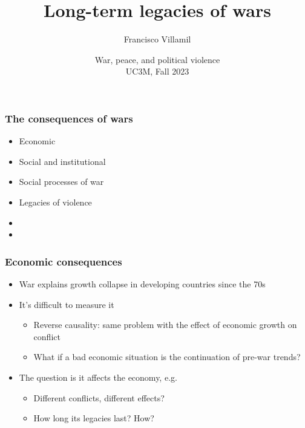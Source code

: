 \documentclass[aspectratio=43]{beamer}
\title{\huge Long-term legacies of wars}
\author{Francisco Villamil}
\date{War, peace, and political violence\\UC3M, Fall 2023}
\begin{document}
\begin{frame}
  \titlepage
\end{frame}


\begin{frame}
\frametitle{The consequences of wars}
\centering

\begin{itemize}
  \item Economic
  \item<2-> Social and institutional
  \item<3-> Social processes of war
  \item<4-> Legacies of violence
  \item<5->[]
  \item<5-> {}
\end{itemize}

\end{frame}

\begin{frame}
\frametitle{Economic consequences}
\centering

\begin{itemize}[<+->]
  \item War explains growth collapse in developing countries since the 70s
  \item It's difficult to measure it
  \begin{itemize}
    \item Reverse causality: same problem with the effect of economic growth on conflict
    \item What if a bad economic situation is the continuation of pre-war trends?
  \end{itemize}
  \item The question is {} it affects the economy, e.g.
  \begin{itemize}
    \item Different conflicts, different effects?
    \item How long its legacies last? How?
  \end{itemize}
\end{itemize}

\end{frame}
\end{document}
